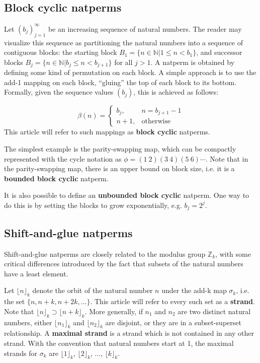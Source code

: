 \documentclass[12pt,reqno]{article}
\begin{document}
\subsection{Block cyclic natperms}

Let $(b_j)_{j=1}^{\infty}$ be an increasing sequence of natural numbers. The reader may visualize this sequence as partitioning the natural numbers into a sequence of contiguous blocks: the starting block $B_1 = \{ n \in \mathbb{N} | 1 \leq n < b_1 \}$, and successor blocks $B_j = \{ n \in \mathbb{N} |  b_j \leq n < b_{j+1} \}$ for all $j > 1$. A natperm is obtained by defining some kind of permutation on each block. A simple approach is to use the add-1 mapping on each block, ``gluing'' the top of each block to its bottom. Formally, given the sequence values $(b_j)$, this is achieved as follows:

\begin{equation}
  \beta(n) = \begin{cases}
    b_j, & n = b_{j+1} - 1 \\
    n + 1, & \text{otherwise}
  \end{cases}
\end{equation}
This article will refer to such mappings as \textbf{block cyclic} natperms. 

The simplest example is the parity-swapping map, which can be compactly represented with the cycle notation as $\phi = (1 \ 2)(3 \ 4)(5 \ 6)\cdots$. Note that in the parity-swapping map, there is an upper bound on block size, i.e. it is a \textbf{bounded block cyclic} natperm.

It is also possible to define an \textbf{unbounded block cyclic} natperm. One way to do this is by setting the blocks to grow exponentially, e.g. $b_j = 2^j$.

\subsection{Shift-and-glue natperms}

Shift-and-glue natperms are closely related to the modulus group $\mathbb{Z}_k$, with some critical differences introduced by the fact that subsets of the natural numbers have a least element.

Let ${\lfloor n \rfloor}_k$ denote the orbit of the natural number $n$ under the add-k map $\sigma_k$, i.e. the set $\{ n, n + k, n + 2k, \ldots \}$. This article will refer to every such set as a \textbf{strand}. Note that ${\lfloor n \rfloor}_k \supset {\lfloor n + k \rfloor}_k$. More generally, if $n_1$ and $n_2$ are two distinct natural numbers, either ${\lfloor n_1 \rfloor}_k$ and ${\lfloor n_2 \rfloor}_k$ are disjoint, or they are in a subset-superset relationship. A \textbf{maximal strand} is a strand which is not contained in any other strand. With the convention that natural numbers start at 1, the maximal strands for $\sigma_k$ are ${\lfloor 1 \rfloor}_k$, ${\lfloor 2 \rfloor}_k$, $\ldots$, ${\lfloor k \rfloor}_k$. 
\end{document}
